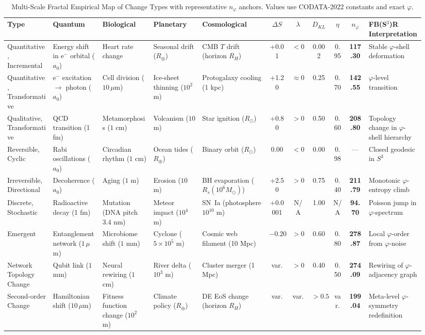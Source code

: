 \documentclass[aps,prd,reprint,onecolumn,nofootinbib]{revtex4-2}
\begin{document}
\begin{table}[t]
\caption{Multi-Scale Fractal Empirical Map of Change Types with representative $n_\varphi$ anchors. Values use CODATA-2022 constants and exact $\varphi$.}
\centering
\setlength{\tabcolsep}{4pt}
\renewcommand{\arraystretch}{1.12}
\begin{tabularx}{\textwidth}{l YYYY cccc c Y}
\toprule
\textbf{Type} &
\textbf{Quantum} &
\textbf{Biological} &
\textbf{Planetary} &
\textbf{Cosmological} &
$\Delta S$ & $\lambda$ & $D_{KL}$ & $\eta$ & $n_\varphi$ &
\textbf{FB(S$^3$)R Interpretation} \\
\midrule
Quantitative, Incremental &
Energy shift in e$^-$ orbital ($a_0$) &
Heart rate change &
Seasonal drift ($R_\oplus$) &
CMB $T$ drift (horizon $R_H$) &
+0.01 & $<0$ & 0.002 & 0.95 & \textbf{117.30} &
Stable $\varphi$-shell deformation \\
%
Quantitative, Transformative &
e$^-$ excitation $\to$ photon ($a_0$) &
Cell division ($10\,\mu$m) &
Ice-sheet thinning ($10^2$ m) &
Protogalaxy cooling (1 kpc) &
+1.20 & $\approx0$ & 0.25 & 0.70 & \textbf{142.55} &
$\varphi$-level transition \\
%
Qualitative, Transformative &
QCD transition (1 fm) &
Metamorphosis ($1$ cm) &
Volcanism ($10$ m) &
Star ignition ($R_\odot$) &
+0.80 & $>0$ & 0.50 & 0.60 & \textbf{208.80} &
Topology change in $\varphi$-shell hierarchy \\
%
Reversible, Cyclic &
Rabi oscillations ($a_0$) &
Circadian rhythm ($1$ cm) &
Ocean tides ($R_\oplus$) &
Binary orbit ($R_\odot$) &
0.00 & $<0$ & 0.00 & 0.98 & --- &
Closed geodesic in $S^3$ \\
%
Irreversible, Directional &
Decoherence ($a_0$) &
Aging ($1$ m) &
Erosion ($10$ m) &
BH evaporation ($R_s(10^6M_\odot)$) &
+2.50 & $>0$ & 0.75 & 0.40 & \textbf{211.79} &
Monotonic $\varphi$-entropy climb \\
%
Discrete, Stochastic &
Radioactive decay (1 fm) &
Mutation (DNA pitch $3.4$ nm) &
Meteor impact ($10^4$ m) &
SN~Ia (photosphere $10^{10}$ m) &
+0.0001 & N/A & 1.00 & N/A & \textbf{94.70} &
Poisson jump in $\varphi$-spectrum \\
%
Emergent &
Entanglement network ($1\,\mu$m) &
Microbiome shift ($1$ mm) &
Cyclone ($5\times10^5$ m) &
Cosmic web filament (10 Mpc) &
$-0.20$ & $>0$ & 0.60 & 0.80 & \textbf{278.87} &
Local $\varphi$-order from $\varphi$-noise \\
%
Network Topology Change &
Qubit link ($1$ mm) &
Neural rewiring ($1$ cm) &
River delta ($10^3$ m) &
Cluster merger (1 Mpc) &
var. & $>0$ & 0.40 & 0.50 & \textbf{274.09} &
Rewiring of $\varphi$-adjacency graph \\
%
Second-order Change &
Hamiltonian shift ($10\,\mu$m) &
Fitness function change ($10^2$ m) &
Climate policy ($R_\oplus$) &
DE EoS change (horizon $R_H$) &
var. & var. & $>0.5$ & var. & \textbf{199.04} &
Meta-level $\varphi$-symmetry redefinition \\
\bottomrule
\end{tabularx}
\end{table}
\end{document}
